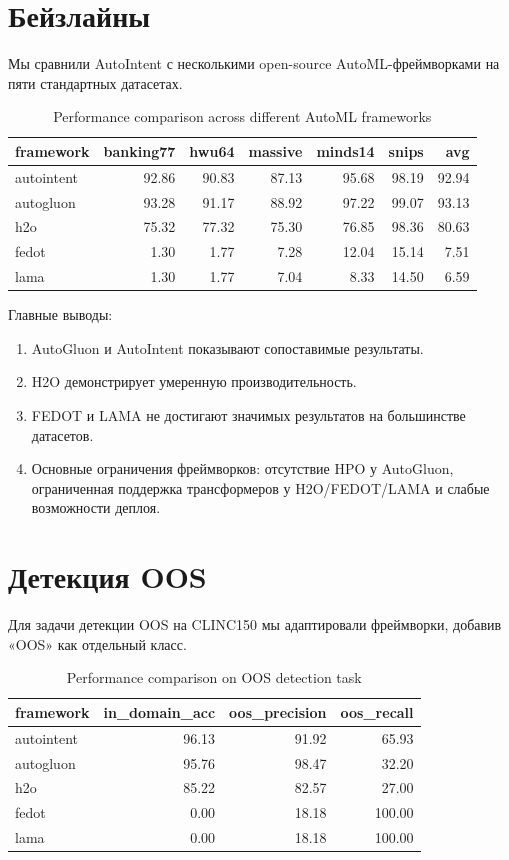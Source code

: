 \documentclass[14pt,a4paper,oneside,openany]{extbook}
\begin{document}
\section{Бейзлайны}
\label{sec:org5cefa82}

Мы сравнили AutoIntent с несколькими open-source AutoML-фреймворками на пяти стандартных датасетах.

\begin{table}[htbp]
\caption{\label{tab:baselines}Performance comparison across different AutoML frameworks}
\centering
\begin{tabular}{lrrrrrr}
framework & banking77 & hwu64 & massive & minds14 & snips & avg\\
\hline
autointent & 92.86 & 90.83 & 87.13 & 95.68 & 98.19 & 92.94\\
autogluon & 93.28 & 91.17 & 88.92 & 97.22 & 99.07 & 93.13\\
h2o & 75.32 & 77.32 & 75.30 & 76.85 & 98.36 & 80.63\\
fedot & 1.30 & 1.77 & 7.28 & 12.04 & 15.14 & 7.51\\
lama & 1.30 & 1.77 & 7.04 & 8.33 & 14.50 & 6.59\\
\end{tabular}
\end{table}

Главные выводы:

\begin{enumerate}
\item AutoGluon и AutoIntent показывают сопоставимые результаты.
\item H2O демонстрирует умеренную производительность.
\item FEDOT и LAMA не достигают значимых результатов на большинстве датасетов.
\item Основные ограничения фреймворков: отсутствие HPO у AutoGluon, ограниченная поддержка трансформеров у H2O/FEDOT/LAMA и слабые возможности деплоя.
\end{enumerate}
\section{Детекция OOS}
\label{sec:org65a3f1d}

Для задачи детекции OOS на CLINC150 мы адаптировали фреймворки, добавив «OOS» как отдельный класс.

\begin{table}[htbp]
\caption{\label{tab:oos}Performance comparison on OOS detection task}
\centering
\begin{tabular}{lrrr}
framework & in\_domain\_acc & oos\_precision & oos\_recall\\
\hline
autointent & 96.13 & 91.92 & 65.93\\
autogluon & 95.76 & 98.47 & 32.20\\
h2o & 85.22 & 82.57 & 27.00\\
fedot & 0.00 & 18.18 & 100.00\\
lama & 0.00 & 18.18 & 100.00\\
\end{tabular}
\end{table}
\end{document}
